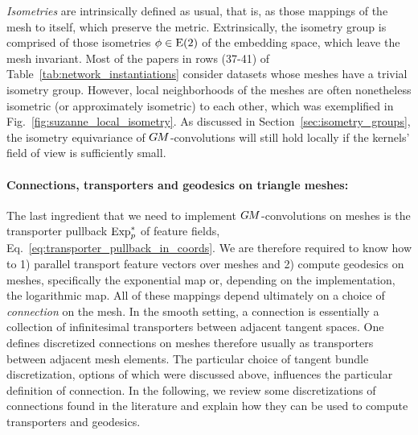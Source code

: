 \emph{Isometries} are intrinsically defined as usual, that is, as those mappings of the mesh to itself, which preserve the metric.
Extrinsically, the isometry group is comprised of those isometries $\phi \in \operatorname{E}(2)$ of the embedding space, which leave the mesh invariant.
Most of the papers in
rows (37-41)
of Table~\ref{tab:network_instantiations}
consider datasets whose meshes have a trivial isometry group.
However, local neighborhoods of the meshes are often nonetheless isometric (or approximately isometric) to each other, which was exemplified in Fig.~\ref{fig:suzanne_local_isometry}.
As discussed in Section~\ref{sec:isometry_groups}, the isometry equivariance of $G\mkern-1.4muM$-convolutions will still hold locally if the kernels' field of view is sufficiently small.







\paragraph{Connections, transporters and geodesics on triangle meshes:}
The last ingredient that we need to implement $G\mkern-1.4muM$-convolutions on meshes is the transporter pullback $\operatorname{Exp}^*_p$ of feature fields, Eq.~\eqref{eq:transporter_pullback_in_coords}.
We are therefore required to know how to
1) parallel transport feature vectors over meshes and
2) compute geodesics on meshes, specifically the exponential map or, depending on the implementation, the logarithmic map.
All of these mappings depend ultimately on a choice of \emph{connection} on the mesh.
In the smooth setting, a connection is essentially a collection of infinitesimal transporters between adjacent tangent spaces.
One defines discretized connections on meshes therefore usually as transporters between adjacent mesh elements.
The particular choice of tangent bundle discretization, options of which were discussed above, influences the particular definition of connection.
In the following, we review some discretizations of connections found in the literature and explain how they can be used to compute transporters and geodesics.



